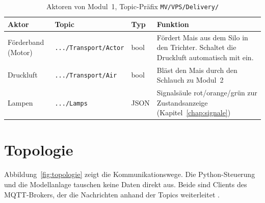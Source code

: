 \begin{table}[htbp]
  \centering
  \footnotesize
  \begin{tabularx}{\textwidth}{@{}l l l X@{}}
    \toprule
    \textbf{Aktor} & \textbf{Topic} & \textbf{Typ} & \textbf{Funktion} \\
    \midrule
    Förderband (Motor) & \texttt{.../Transport/Actor} & bool & Fördert Mais aus dem Silo in den Trichter. Schaltet die Druckluft automatisch mit ein. \\
    Druckluft          & \texttt{.../Transport/Air}   & bool & Bläst den Mais durch den Schlauch zu Modul~2 \\
    Lampen             & \texttt{.../Lamps}           & JSON & Signalsäule rot/orange/grün zur Zustandsanzeige (Kapitel~\ref{chap:signale}) \\
    \bottomrule
  \end{tabularx}
  \caption[Aktoren von Modul~1]{Aktoren von Modul~1, Topic-Präfix \texttt{MV/VPS/Delivery/}}
  \label{tab:aktoren}
\end{table}

\clearpage
\section{Topologie}
\label{sec:topologie}

Abbildung~\ref{fig:topologie} zeigt die Kommunikationswege. Die Python-Steuerung
und die Modellanlage tauschen keine Daten direkt aus. Beide sind Clients des
MQTT-Brokers, der die Nachrichten anhand der Topics weiterleitet
\cite{mqtt311}.

